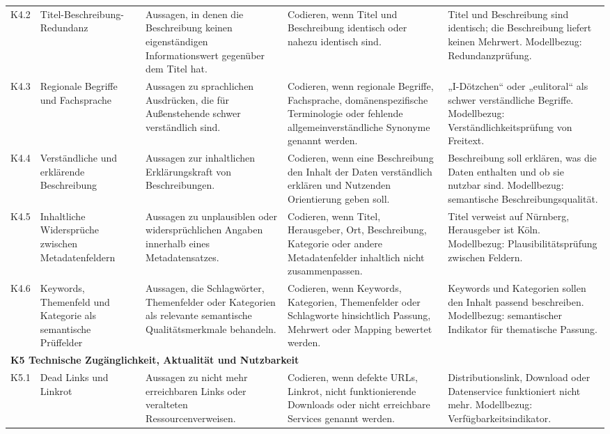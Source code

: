 \begin{longtable}{p{1cm} p{2.5cm} p{3.2cm} p{4.5cm} p{4.5cm}}
K4.2 & Titel-Beschreibung-Redundanz
& Aussagen, in denen die Beschreibung keinen eigenständigen Informationswert gegenüber dem Titel hat.
& Codieren, wenn Titel und Beschreibung identisch oder nahezu identisch sind.
& Titel und Beschreibung sind identisch; die Beschreibung liefert keinen Mehrwert. Modellbezug: Redundanzprüfung. \\

K4.3 & Regionale Begriffe und Fachsprache
& Aussagen zu sprachlichen Ausdrücken, die für Außenstehende schwer verständlich sind.
& Codieren, wenn regionale Begriffe, Fachsprache, domänenspezifische Terminologie oder fehlende allgemeinverständliche Synonyme genannt werden.
& „I-Dötzchen“ oder „eulitoral“ als schwer verständliche Begriffe. Modellbezug: Verständlichkeitsprüfung von Freitext. \\

K4.4 & Verständliche und erklärende Beschreibung
& Aussagen zur inhaltlichen Erklärungskraft von Beschreibungen.
& Codieren, wenn eine Beschreibung den Inhalt der Daten verständlich erklären und Nutzenden Orientierung geben soll.
& Beschreibung soll erklären, was die Daten enthalten und ob sie nutzbar sind. Modellbezug: semantische Beschreibungsqualität. \\

K4.5 & Inhaltliche Widersprüche zwischen Metadatenfeldern
& Aussagen zu unplausiblen oder widersprüchlichen Angaben innerhalb eines Metadatensatzes.
& Codieren, wenn Titel, Herausgeber, Ort, Beschreibung, Kategorie oder andere Metadatenfelder inhaltlich nicht zusammenpassen.
& Titel verweist auf Nürnberg, Herausgeber ist Köln. Modellbezug: Plausibilitätsprüfung zwischen Feldern. \\

K4.6 & Keywords, Themenfeld und Kategorie als semantische Prüffelder
& Aussagen, die Schlagwörter, Themenfelder oder Kategorien als relevante semantische Qualitätsmerkmale behandeln.
& Codieren, wenn Keywords, Kategorien, Themenfelder oder Schlagworte hinsichtlich Passung, Mehrwert oder Mapping bewertet werden.
& Keywords und Kategorien sollen den Inhalt passend beschreiben. Modellbezug: semantischer Indikator für thematische Passung. \\

\midrule
\multicolumn{5}{l}{\textbf{K5 Technische Zugänglichkeit, Aktualität und Nutzbarkeit}} \\
\midrule

K5.1 & Dead Links und Linkrot
& Aussagen zu nicht mehr erreichbaren Links oder veralteten Ressourcenverweisen.
& Codieren, wenn defekte URLs, Linkrot, nicht funktionierende Downloads oder nicht erreichbare Services genannt werden.
& Distributionslink, Download oder Datenservice funktioniert nicht mehr. Modellbezug: Verfügbarkeitsindikator. \\


\end{longtable}
